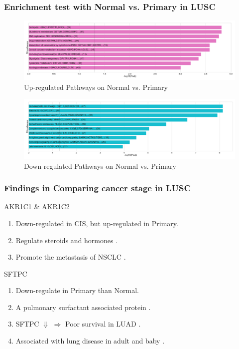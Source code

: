 \documentclass{beamer}
\begin{document}
    \begin{frame}
        \frametitle{Enrichment test with Normal vs. Primary in LUSC}

        \begin{figure}
            \includegraphics[width=0.8 \linewidth]{figures/DEG/Enrichment/STAR.SQC.Normal-Primary.Up.KEGG.pdf}
            \caption{Up-regulated Pathways on Normal vs. Primary}
        \end{figure}

        \begin{figure}
            \includegraphics[width=0.8 \linewidth]{figures/DEG/Enrichment/STAR.SQC.Normal-Primary.Down.KEGG.pdf}
            \caption{Down-regulated Pathways on Normal vs. Primary}
        \end{figure}
    \end{frame}

    \begin{frame}
        \frametitle{Findings in Comparing cancer stage in LUSC}

        \begin{block}{AKR1C1 \& AKR1C2}
            \begin{enumerate}
                \item Down-regulated in CIS, but up-regulated in Primary.
                \item Regulate steroids \cite{AKR1C1-1} and hormones \cite{AKR1C1-2}.
                \item Promote the metastasis of NSCLC \cite{AKR1C1-3}.
            \end{enumerate}
        \end{block}

        \begin{block}{SFTPC}
            \begin{enumerate}
                \item Down-regulate in Primary than Normal.
                \item A pulmonary surfactant associated protein \cite{SFTPC4}.
                \item SFTPC $\Downarrow$ $\Rightarrow$ Poor survival in LUAD \cite{SFTPC1}.
                \item Associated with lung disease in adult \cite{SFTPC2} and baby \cite{SFTPC3}.
            \end{enumerate}
        \end{block}
    \end{frame}
\end{document}
